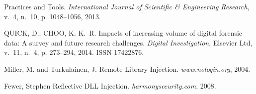 \documentclass[conference]{IEEEtran}
\begin{document}
\begin{thebibliography}{1}
{{Practices and Tools}.
\emph{International Journal of Scientific {\&} Engineering Research}, v.~4,
  n.~10, p. 1048--1056, 2013.}
  
{QUICK, D.; CHOO, K. K.~R. {Impacts of increasing volume of digital forensic
  data: A survey and future research challenges}.
\emph{Digital Investigation}, Elsevier Ltd, v.~11, n.~4, p. 273--294, 2014.
ISSN 17422876.}

{Miller, M. and Turkulainen, J. {Remote Library Injection}.
\emph{www.nologin.org}, 2004. }

{Fewer, Stephen {Reflective DLL Injection}.
\emph{harmonysecurity.com}, 2008. }

\end{thebibliography}

\end{document}

